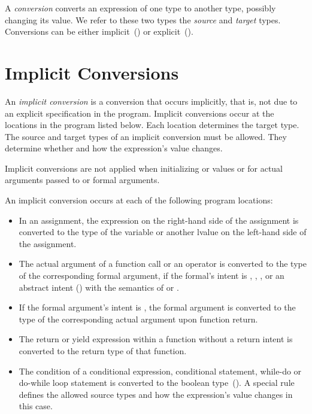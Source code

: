 \label{Conversions}

A \emph{conversion} converts an expression of one type to another type,
possibly changing its value.
We refer to these two types the \emph{source} and \emph{target} types.
Conversions can be either
implicit~() or
explicit~().


\section{Implicit Conversions}
\label{Implicit_Conversions}

An \emph{implicit conversion} is a conversion that occurs implicitly,
that is, not due to an explicit specification in the program.
Implicit conversions occur at the locations in the program listed below.
Each location determines the target type.
The source and target types of an implicit conversion must be allowed.
They determine whether and how the expression's value changes.

Implicit conversions are not applied when initializing  or
 values or for actual arguments passed to  or
 formal arguments.

An implicit conversion occurs at each of the following program locations:

\begin{itemize}
\item In an assignment, the expression on the right-hand side of
      the assignment is converted to the type of the variable
      or another lvalue on the left-hand side of the assignment.

\item The actual argument of a function call or an operator is converted
      to the type of the corresponding formal argument, if the formal's
      intent is , , , or an abstract intent
      () with the semantics of
       or .

\item If the formal argument's intent is , the formal argument
      is converted to the type of the corresponding actual argument
      upon function return.

\item The return or yield expression within a function without a 
      return intent is converted to the return type of that function.

\item The condition of a conditional expression,
      conditional statement, while-do or do-while loop statement
      is converted to the boolean type~().
      A special rule defines the allowed source types and
      how the expression's value changes in this case.
\end{itemize}


